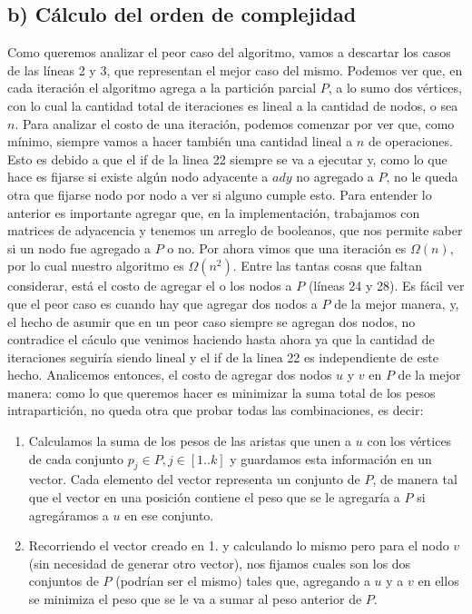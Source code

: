 \documentclass[a4paper]{article}
\begin{document}
\subsection*{b) Cálculo del orden de complejidad}
Como queremos analizar el peor caso del algoritmo, vamos a descartar los casos de las líneas 2 y 3, que representan el mejor caso del mismo.
\newline Podemos ver que, en cada iteración el algoritmo agrega a la partición parcial $P$, a lo sumo dos vértices, con lo cual la cantidad total de iteraciones es lineal a la cantidad de nodos, o sea $n$. Para analizar el costo de una iteración, podemos comenzar por ver que, como mínimo, siempre vamos a hacer también una cantidad lineal a $n$ de operaciones. Esto es debido a que el if de la linea 22 siempre se va a ejecutar y, como lo que hace es fijarse si existe algún nodo adyacente a $ady$ no agregado a $P$, no le queda otra que fijarse nodo por nodo a ver si alguno cumple esto. Para entender lo anterior es importante agregar que, en la implementación, trabajamos con matrices de adyacencia y tenemos un arreglo de booleanos, que nos permite saber si un nodo fue agregado a $P$ o no. Por ahora vimos que una iteración es $\Omega(n)$, por lo cual nuestro algoritmo es $\Omega(n^2)$. 
\newline Entre las tantas cosas que faltan considerar, está el costo de agregar el o los nodos a $P$ (líneas 24 y 28). Es fácil ver que el peor caso es cuando hay que agregar dos nodos a $P$ de la mejor manera, y, el hecho de asumir que en un peor caso siempre se agregan dos nodos, no contradice el cáculo que venimos haciendo hasta ahora ya que la cantidad de iteraciones seguiría siendo lineal y el if de la linea 22 es independiente de este hecho. 
\newline \newline Analicemos entonces, el costo de agregar dos nodos $u$ y $v$ en $P$ de la mejor manera: como lo que queremos hacer es minimizar la suma total de los pesos intrapartición, no queda otra que probar todas las combinaciones, es decir:
\begin{enumerate}
\item Calculamos la suma de los pesos de las aristas que unen a $u$ con los vértices de cada conjunto $p_j \in P, j \in [1..k]$ y guardamos esta información en un vector. Cada elemento del vector representa un conjunto de $P$, de manera tal que el vector en una posición contiene el peso que se le agregaría a $P$ si agregáramos a $u$ en ese conjunto.
\item Recorriendo el vector creado en 1. y calculando lo mismo pero para el nodo $v$ (sin necesidad de generar otro vector), nos fijamos cuales son los dos conjuntos de $P$ (podrían ser el mismo) tales que, agregando a $u$ y a $v$ en ellos se minimiza el peso que se le va a sumar al peso anterior de $P$.
\end{enumerate}
\vspace{0.4cm}
\end{document}
